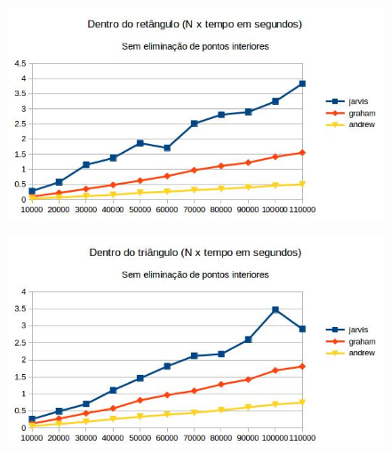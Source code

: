 \documentclass[11pt,a4paper]{article}
\begin{document}
        \begin{figure}[!htb]
                \captionsetup{justification=centering,margin=2cm}
            \centering
              \begin{minipage}[b]{\textwidth}
              \centering
                  \includegraphics[width=\linewidth]{graph_retangulo_no}
                  \label{fig:map}
                \end{minipage}
              \begin{minipage}[b]{\textwidth}
              \centering
                  \includegraphics[width=\linewidth]{graph_triangulo_no}
                  \label{fig:map}
                \end{minipage}
                \caption{}
        \end{figure}
\end{document}
